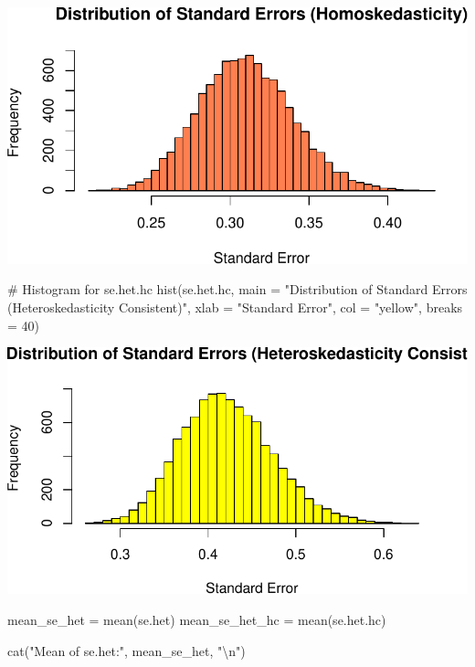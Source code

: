 \documentclass[
  11pt,
]{article}
\newenvironment{Shaded}{\begin{snugshade}}{\end{snugshade}}
\newcommand{\AttributeTok}[1]{\textcolor[rgb]{0.40,0.45,0.13}{#1}}
\newcommand{\CommentTok}[1]{\textcolor[rgb]{0.37,0.37,0.37}{#1}}
\newcommand{\DecValTok}[1]{\textcolor[rgb]{0.68,0.00,0.00}{#1}}
\newcommand{\FunctionTok}[1]{\textcolor[rgb]{0.28,0.35,0.67}{#1}}
\newcommand{\NormalTok}[1]{\textcolor[rgb]{0.00,0.23,0.31}{#1}}
\newcommand{\OtherTok}[1]{\textcolor[rgb]{0.00,0.23,0.31}{#1}}
\newcommand{\SpecialCharTok}[1]{\textcolor[rgb]{0.37,0.37,0.37}{#1}}
\newcommand{\StringTok}[1]{\textcolor[rgb]{0.13,0.47,0.30}{#1}}
\begin{document}
\includegraphics{HW-4-CODE-and-ANSWERS_files/figure-pdf/unnamed-chunk-17-4.pdf}

\begin{Shaded}
\begin{Highlighting}[]
\CommentTok{\# Histogram for se.het.hc}
\FunctionTok{hist}\NormalTok{(se.het.hc, }
     \AttributeTok{main =} \StringTok{"Distribution of Standard Errors (Heteroskedasticity Consistent)"}\NormalTok{, }
     \AttributeTok{xlab =} \StringTok{"Standard Error"}\NormalTok{, }\AttributeTok{col =} \StringTok{"yellow"}\NormalTok{, }\AttributeTok{breaks =} \DecValTok{40}\NormalTok{)}
\end{Highlighting}
\end{Shaded}

\includegraphics{HW-4-CODE-and-ANSWERS_files/figure-pdf/unnamed-chunk-17-5.pdf}

\begin{Shaded}
\begin{Highlighting}[]
\NormalTok{mean\_se\_het }\OtherTok{=} \FunctionTok{mean}\NormalTok{(se.het)}
\NormalTok{mean\_se\_het\_hc }\OtherTok{=} \FunctionTok{mean}\NormalTok{(se.het.hc)}

\FunctionTok{cat}\NormalTok{(}\StringTok{"Mean of se.het:"}\NormalTok{, mean\_se\_het, }\StringTok{"}\SpecialCharTok{\textbackslash{}n}\StringTok{"}\NormalTok{)}
\end{Highlighting}
\end{Shaded}
\end{document}
